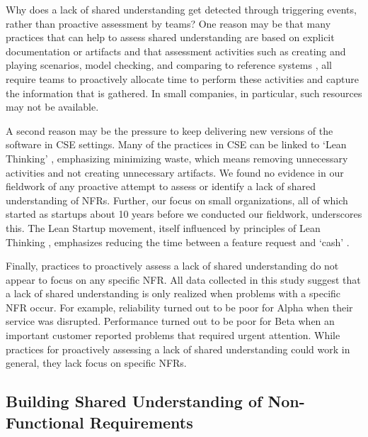 \documentclass[smallextended]{svjour3}        %
\begin{document}
Why does a lack of shared understanding get detected through triggering events, rather than proactive assessment by teams?
One reason may be that many practices that can help to assess shared understanding are based on explicit documentation or artifacts \citep{glinz_shared_2015} and that assessment activities such as 
creating and playing scenarios, model checking, and comparing to reference systems \citep{glinz_shared_2015}, 
all require teams to proactively allocate time to perform these activities and capture the information that is gathered. In small companies, in particular, such resources may not be available.

A second reason may be the pressure to keep delivering new versions of the software in CSE settings. Many of the practices in CSE can be linked to `Lean Thinking' \citep{fitzgerald2017continuous}, emphasizing minimizing waste, which means removing unnecessary activities and not creating unnecessary artifacts. We found no evidence in our fieldwork of any proactive attempt to assess or identify a lack of shared understanding of NFRs. 
Further, our focus on small organizations, all of which started as startups about 10 years before we conducted our fieldwork, underscores this. The Lean Startup movement, itself influenced by principles of Lean Thinking \citep{ries_lean_2011}, emphasizes reducing the time between a feature request and `cash' \citep{fitzgerald2017continuous}. 

Finally, practices to proactively assess a lack of shared understanding do not appear to focus on any specific NFR. All data collected in this study suggest that a lack of shared understanding is only realized when problems with a specific NFR occur. For example, reliability turned out to be poor for Alpha when their service was disrupted. Performance turned out to be poor for Beta when an important customer reported problems that required urgent attention.
While practices for proactively assessing a lack of shared understanding could work in general, they lack focus on specific NFRs.








\subsection{Building Shared Understanding of Non-Functional Requirements}
\end{document}
